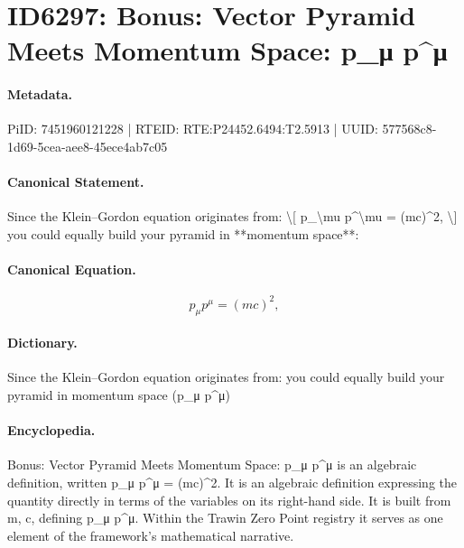 \section*{ID6297: Bonus: Vector Pyramid Meets Momentum Space: p\_μ p\textasciicircum{}μ}
\paragraph{Metadata.}
PiID: 7451960121228 | RTEID: RTE:P24452.6494:T2.5913 | UUID: 577568c8-1d69-5cea-aee8-45ece4ab7c05

\paragraph{Canonical Statement.}
Since the Klein–Gordon equation originates from: \textbackslash{}[ p\_\textbackslash{}mu p\textasciicircum{}\textbackslash{}mu = (mc)\textasciicircum{}2, \textbackslash{}] you could equally build your pyramid in **momentum space**:

\paragraph{Canonical Equation.}
\[
p_\mu p^\mu = (mc)^2,
\]

\paragraph{Dictionary.}
Since the Klein–Gordon equation originates from: you could equally build your pyramid in momentum space (p\_μ p\textasciicircum{}μ)

\paragraph{Encyclopedia.}
Bonus: Vector Pyramid Meets Momentum Space: p\_μ p\textasciicircum{}μ is an algebraic definition, written p\_μ p\textasciicircum{}μ = (mc)\textasciicircum{}2. It is an algebraic definition expressing the quantity directly in terms of the variables on its right-hand side. It is built from m, c, defining p\_μ p\textasciicircum{}μ. Within the Trawin Zero Point registry it serves as one element of the framework's mathematical narrative.
